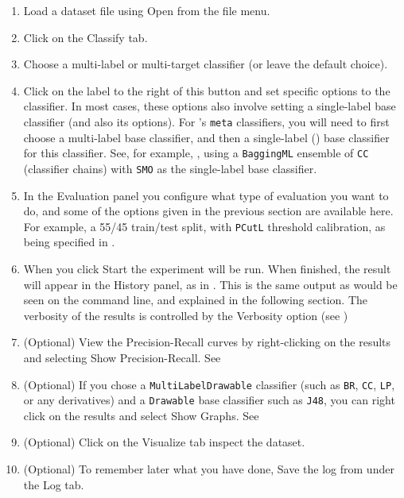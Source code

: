 \documentclass[11pt]{article}
\newcommand{\MEKA}{Meka}
\newcommand{\WEKA}{Weka}
\begin{document}
\begin{enumerate}
	\item Load a dataset file using \textsf{Open} from the file menu. %
	\item Click on the \textsf{Classify} tab.
	\item \textsf{Choose} a multi-label or multi-target classifier (or leave the default choice).  
	\item Click on the label to the right of this button and set specific options to the classifier. In most cases, these options also involve setting a \framework{\WEKA} single-label base classifier (and also its options). For \framework{\MEKA}'s \texttt{meta} classifiers, you will need to first choose a multi-label base classifier, and then a single-label (\framework{\WEKA}) base classifier for this classifier. See, for example, , using a \texttt{BaggingML} ensemble of \texttt{CC} (classifier chains) with \texttt{SMO} as the single-label base classifier.
	\item In the \textsf{Evaluation} panel you configure what type of evaluation you want to do, and some of the options given in the previous section are available here. For example, a 55/45 train/test split, with \texttt{PCutL} threshold calibration, as being specified in .
	\item When you click \textsf{Start} the experiment will be run. When finished, the result will appear in the \textsf{History} panel, as in . This is the same output as would be seen on the command line, and explained in the following section. The verbosity of the results is controlled by the \textsf{Verbosity} option (see )
	\item (Optional) View the Precision-Recall curves by right-clicking on the results and selecting \textsf{Show Precision-Recall}. See 
	\item (Optional) If you chose a \texttt{MultiLabelDrawable} classifier (such as \texttt{BR}, \texttt{CC}, \texttt{LP}, or any derivatives) and a \texttt{Drawable} base classifier such as \texttt{J48}, you can right click on the results and select \textsf{Show Graphs}. See 
	\item (Optional) Click on the \textsf{Visualize} tab inspect the dataset.
	\item (Optional) To remember later what you have done, \textsf{Save} the log from under the \textsf{Log} tab. 
\end{enumerate}
\end{document}
